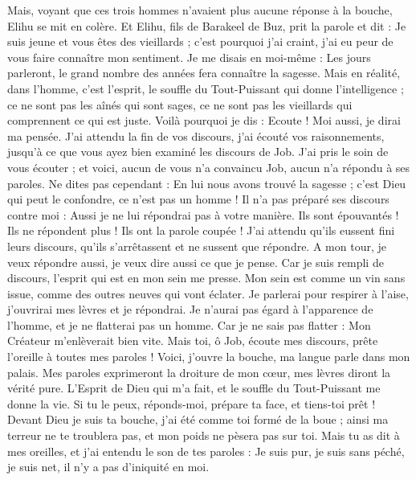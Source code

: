 \begin{multicols}{2}
Mais, voyant que ces trois hommes n'avaient plus aucune réponse à la bouche, Elihu se mit en colère.
Et Elihu, fils de Barakeel de Buz, prit la parole et dit : Je suis jeune et vous êtes des vieillards ; c'est pourquoi j'ai craint, j'ai eu peur de vous faire connaître mon sentiment.
Je me disais en moi-même : Les jours parleront, le grand nombre des années fera connaître la sagesse.
Mais en réalité, dans l'homme, c'est l'esprit, le souffle du Tout-Puissant qui donne l'intelligence ;
ce ne sont pas les aînés qui sont sages, ce ne sont pas les vieillards qui comprennent ce qui est juste.
Voilà pourquoi je dis : Ecoute ! Moi aussi, je dirai ma pensée.
J'ai attendu la fin de vos discours, j'ai écouté vos raisonnements, jusqu'à ce que vous ayez bien examiné les discours de Job.
J'ai pris le soin de vous écouter ; et voici, aucun de vous n'a convaincu Job, aucun n'a répondu à ses paroles.
Ne dites pas cependant : En lui nous avons trouvé la sagesse ; c'est Dieu qui peut le confondre, ce n'est pas un homme !
Il n'a pas préparé ses discours contre moi : Aussi je ne lui répondrai pas à votre manière.
Ils sont épouvantés ! Ils ne répondent plus ! Ils ont la parole coupée !
J'ai attendu qu'ils eussent fini leurs discours, qu'ils s'arrêtassent et ne sussent que répondre.
A mon tour, je veux répondre aussi, je veux dire aussi ce que je pense.
Car je suis rempli de discours, l'esprit qui est en mon sein me presse.
Mon sein est comme un vin sans issue, comme des outres neuves qui vont éclater.
Je parlerai pour respirer à l'aise, j'ouvrirai mes lèvres et je répondrai.
Je n'aurai pas égard à l'apparence de l'homme, et je ne flatterai pas un homme.
Car je ne sais pas flatter : Mon Créateur m'enlèverait bien vite.
\VerseOne{}Mais toi, ô Job, écoute mes discours, prête l'oreille à toutes mes paroles !
Voici, j'ouvre la bouche, ma langue parle dans mon palais.
Mes paroles exprimeront la droiture de mon cœur, mes lèvres diront la vérité pure.
L'Esprit de Dieu qui m'a fait, et le souffle du Tout-Puissant me donne la vie.
Si tu le peux, réponds-moi, prépare ta face, et tiens-toi prêt !
Devant Dieu je suis ta bouche, j'ai été comme toi formé de la boue ;
ainsi ma terreur ne te troublera pas, et mon poids ne pèsera pas sur toi.
Mais tu as dit à mes oreilles, et j'ai entendu le son de tes paroles :
Je suis pur, je suis sans péché, je suis net, il n'y a pas d'iniquité en moi.

\end{multicols}

